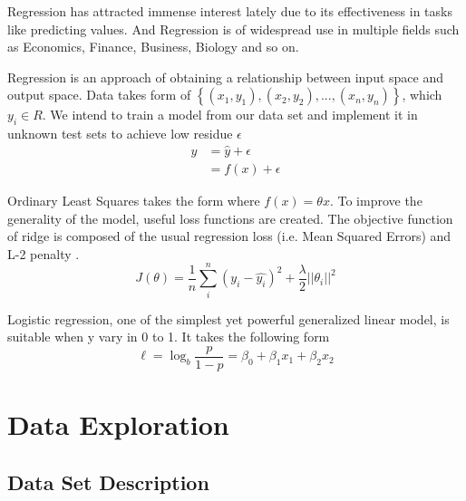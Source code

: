 \documentclass{article}
\begin{document}
Regression has attracted immense interest lately due to its effectiveness in tasks like predicting values. And Regression is of widespread use in multiple fields such as Economics, Finance, Business, Biology and so on. 

Regression is an approach of obtaining a relationship between input space and output space. Data takes form of  $\left\{(x_1,y_1),(x_2,y_2),...,(x_n,y_n)\right\}$, which $y_i  \in R$. We intend to train a model from our data set and implement it in unknown test sets to achieve low residue $\epsilon$
\begin{subequations}
\renewcommand{\theequation}{\theparentequation.\arabic{equation}}
\begin{align}
y &= \hat{y} + \epsilon \\
  &= f(x) + \epsilon 
\end{align}
\end{subequations}



Ordinary Least Squares takes the form where $f(x)=\theta x$.
To improve the generality of the model, useful loss functions are created. The objective function of ridge is composed of the usual regression loss (i.e. Mean Squared Errors) and L-2 penalty \cite{ridge}. 
\begin{equation}
        J(\theta) = \frac{1}{n}\sum \limits_{i} ^ {n} (y_i -                    \hat{y_i})^2 + \frac{\lambda}{2}||\theta _i||^2          
  \end{equation}

Logistic regression, one of the simplest yet powerful generalized linear model, is suitable when y vary in 0 to 1. It takes the following form
$$
\ell=\log _{b} \frac{p}{1-p}=\beta_{0}+\beta_{1} x_{1}+\beta_{2} x_{2}
$$



\section{Data Exploration}
\label{DataExploration}
\subsection{Data Set Description}
 
\end{document}
